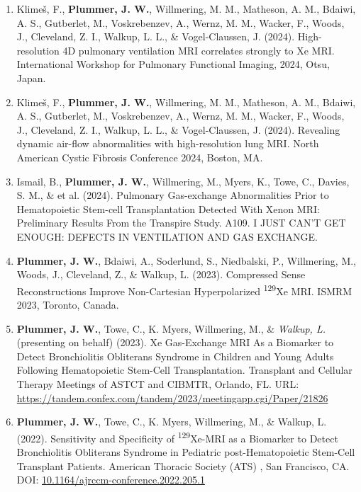 \documentclass[12pt,]{scrartcl}
\begin{document}
\begin{enumerate}
  \item Klimeš, F., \textbf{Plummer, J. W.}, Willmering, M. M., Matheson, A. M., Bdaiwi, A. S., Gutberlet, M., Voskrebenzev, A., Wernz, M. M., Wacker, F., Woods, J., Cleveland, Z. I., Walkup, L. L., \& Vogel-Claussen, J. (2024). High-resolution 4D pulmonary ventilation MRI correlates strongly to Xe MRI. International Workshop for Pulmonary Functional Imaging, 2024, Otsu, Japan.

  \item Klimeš, F., \textbf{Plummer, J. W.}, Willmering, M. M., Matheson, A. M., Bdaiwi, A. S., Gutberlet, M., Voskrebenzev, A., Wernz, M. M., Wacker, F., Woods, J., Cleveland, Z. I., Walkup, L. L., \& Vogel-Claussen, J. (2024). Revealing dynamic air-flow abnormalities with high-resolution lung MRI. North American Cystic Fibrosis Conference 2024, Boston, MA. 
  
  \item Ismail, B., \textbf{Plummer, J. W.}, Willmering, M., Myers, K., Towe, C., Davies, S. M., \& et al. (2024). Pulmonary Gas-exchange Abnormalities Prior to Hematopoietic Stem-cell Transplantation Detected With Xenon MRI: Preliminary Results From the Transpire Study. A109. I JUST CAN'T GET ENOUGH: DEFECTS IN VENTILATION AND GAS EXCHANGE.
  
  \item \textbf{Plummer, J. W.}, Bdaiwi, A., Soderlund, S., Niedbalski, P., Willmering, M., Woods, J., Cleveland, Z., \& Walkup, L. (2023). Compressed Sense Reconstructions Improve Non-Cartesian Hyperpolarized \textsuperscript{129}Xe MRI. ISMRM 2023, Toronto, Canada.
  
  \item \textbf{Plummer, J. W.}, Towe, C., K. Myers, Willmering, M., \&  \textit{Walkup, L.} (presenting on behalf) (2023). Xe Gas-Exchange MRI As a Biomarker to Detect Bronchiolitis Obliterans Syndrome in Children and Young Adults Following Hematopoietic Stem-Cell Transplantation. Transplant and Cellular Therapy Meetings of ASTCT and CIBMTR, Orlando, FL. URL: \href{https://tandem.confex.com/tandem/2023/meetingapp.cgi/Paper/21826}{https://tandem.confex.com/tandem/2023/meetingapp.cgi/Paper/21826}
  
  \item \textbf{Plummer, J. W.}, Towe, C., K. Myers, Willmering, M., \& Walkup, L. (2022). Sensitivity and Specificity of \textsuperscript{129}Xe-MRI as a Biomarker to Detect Bronchiolitis Obliterans Syndrome in Pediatric post-Hematopoietic Stem-Cell Transplant Patients. American Thoracic Society (ATS) , San Francisco, CA. DOI: \href{https://www.atsjournals.org/doi/abs/10.1164/ajrccm-conference.2022.205.1_MeetingAbstracts.A2181}{10.1164/ajrccm-conference.2022.205.1}
  

\end{enumerate}
\end{document}
